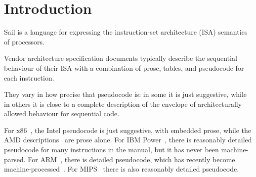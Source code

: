 \section{Introduction}
\label{sec:intro}

Sail is a language for expressing the instruction-set
architecture (ISA) semantics of processors.

Vendor architecture specification documents typically describe the
sequential behaviour of their ISA with a combination of prose, tables,
and pseudocode for each instruction.

They vary in how precise that pseudocode is: in some it is just
suggestive, while in others it is close to a complete description of
the envelope of architecturally allowed behaviour for sequential code.

For x86~\cite{Intel61}, the Intel pseudocode is just suggestive, with
embedded prose, while the AMD descriptions~\cite{AMD_3_21} are prose
alone.  For IBM Power~\cite{Power2.06}, there is reasonably detailed
pseudocode for many instructions in the manual, but it has never been
machine-parsed.  For ARM~\cite{armarmv8}, there is detailed
pseudocode, which has recently become machine-processed~\cite{Reid16}.
For MIPS~\cite{MIPS64-II,MIPS64-III} there is also reasonably detailed
pseudocode.



